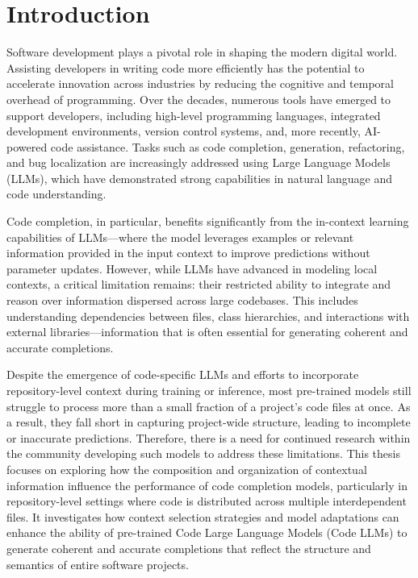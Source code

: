 \chapter*{Introduction}

Software development plays a pivotal role in shaping the modern digital world. Assisting developers in writing code more efficiently has the potential to accelerate innovation across industries by reducing the cognitive and temporal overhead of programming. Over the decades, numerous tools have emerged to support developers, including high-level programming languages, integrated development environments, version control systems, and, more recently, AI-powered code assistance. Tasks such as code completion, generation, refactoring, and bug localization are increasingly addressed using Large Language Models (LLMs), which have demonstrated strong capabilities in natural language and code understanding.

Code completion, in particular, benefits significantly from the in-context learning capabilities of LLMs---where the model leverages examples or relevant information provided in the input context to improve predictions without parameter updates. However, while LLMs have advanced in modeling local contexts, a critical limitation remains: their restricted ability to integrate and reason over information dispersed across large codebases. This includes understanding dependencies between files, class hierarchies, and interactions with external libraries---information that is often essential for generating coherent and accurate completions.

Despite the emergence of code-specific LLMs and efforts to incorporate repository-level context during training or inference, most pre-trained models still struggle to process more than a small fraction of a project's code files at once. As a result, they fall short in capturing project-wide structure, leading to incomplete or inaccurate predictions. Therefore, there is a need for continued research within the community developing such models to address these limitations. This thesis focuses on exploring how the composition and organization of contextual information influence the performance of code completion models, particularly in repository-level settings where code is distributed across multiple interdependent files. It investigates how context selection strategies and model adaptations can enhance the ability of pre-trained Code Large Language Models (Code LLMs) to generate coherent and accurate completions that reflect the structure and semantics of entire software projects.

